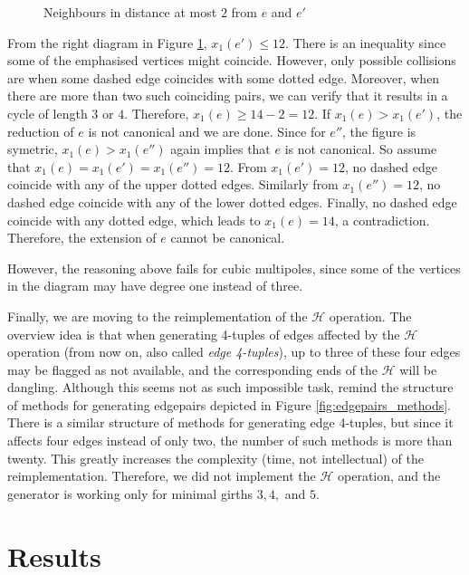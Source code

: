 \begin{figure}[h!]
    \centering
    
    \caption{Neighbours in distance at most $2$ from $e$ and $e'$}
    \label{fig:polehunter_neighbours}
\end{figure}

From the right diagram in Figure \ref{fig:polehunter_neighbours}, $x_1(e') \leq 12$. There is an inequality since some of the emphasised vertices might coincide. However, only possible collisions are when some dashed edge coincides with some dotted edge. Moreover, when there are more than two such coinciding pairs, we can verify that it results in a cycle of length $3$ or $4$. Therefore, $x_1(e)\geq 14-2=12$. If $x_1(e)>x_1(e')$, the reduction of $e$ is not canonical and we are done. Since for $e''$, the figure is symetric, $x_1(e)>x_1(e'')$ again implies that $e$ is not canonical. So assume that $x_1(e)=x_1(e')=x_1(e'')=12$. From $x_1(e')=12$, no dashed edge coincide with any of the upper dotted edges. Similarly from $x_1(e'')=12$, no dashed edge coincide with any of the lower dotted edges. Finally, no dashed edge coincide with any dotted edge, which leads to $x_1(e)=14$, a contradiction. Therefore, the extension of $e$ cannot be canonical.

However, the reasoning above fails for cubic multipoles, since some of the vertices in the diagram may have degree one instead of three.

Finally, we are moving to the reimplementation of the $\mathcal H$ operation. The overview idea is that when generating 4-tuples of edges affected by the $\mathcal H$ operation (from now on, also called \emph{edge 4-tuples}), up to three of these four edges may be flagged as not available, and the corresponding ends of the $\mathcal H$ will be dangling. Although this seems not as such impossible task, remind the structure of methods for generating edgepairs depicted in Figure \ref{fig:edgepairs_methods}. There is a similar structure of methods for generating edge 4-tuples, but since it affects four edges instead of only two, the number of such methods is more than twenty. This greatly increases the complexity (time, not intellectual) of the reimplementation. Therefore, we did not implement the $\mathcal H$ operation, and the generator is working only for minimal girths $3,4,$ and $5$. 

\section{Results}

